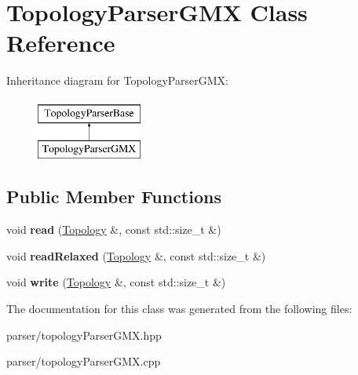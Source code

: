 \hypertarget{classTopologyParserGMX}{}\section{Topology\+Parser\+G\+MX Class Reference}
\label{classTopologyParserGMX}
Inheritance diagram for Topology\+Parser\+G\+MX\+:\begin{figure}[H]
\begin{center}
\leavevmode
\includegraphics[height=2.000000cm]{classTopologyParserGMX}
\end{center}
\end{figure}
\subsection*{Public Member Functions}
\begin{DoxyCompactItemize}
\item 
\mbox{\label{classTopologyParserGMX_a49fd91d03ee08c506e927281006c69ca}} 
void {\bfseries read} (\mbox{\hyperlink{classTopology}{Topology}} \&, const std\+::size\+\_\+t \&)
\item 
\mbox{\label{classTopologyParserGMX_a7c9ad910dffa3a75449d8fda1cfab443}} 
void {\bfseries read\+Relaxed} (\mbox{\hyperlink{classTopology}{Topology}} \&, const std\+::size\+\_\+t \&)
\item 
\mbox{\label{classTopologyParserGMX_a499269cc13e88d86c7ce74364308214c}} 
void {\bfseries write} (\mbox{\hyperlink{classTopology}{Topology}} \&, const std\+::size\+\_\+t \&)
\end{DoxyCompactItemize}


The documentation for this class was generated from the following files\+:\begin{DoxyCompactItemize}
\item 
parser/topology\+Parser\+G\+M\+X.\+hpp\item 
parser/topology\+Parser\+G\+M\+X.\+cpp\end{DoxyCompactItemize}
